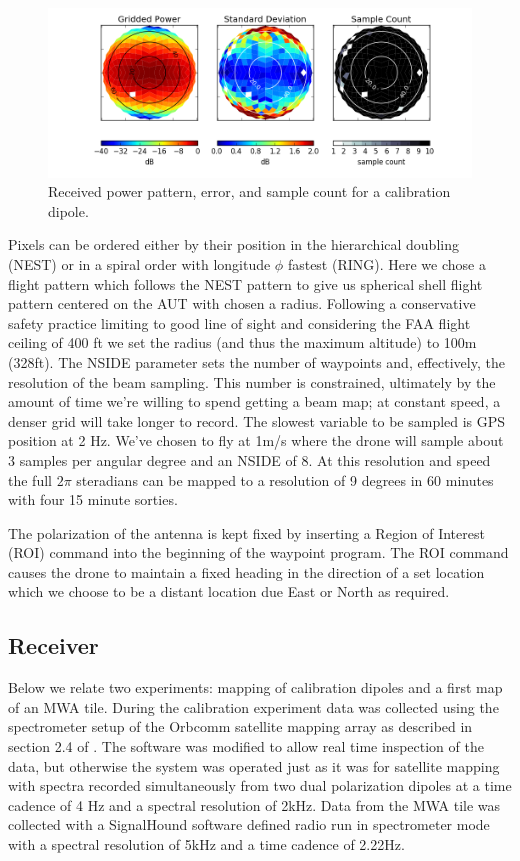 \documentclass[preprint2,numberedappendix,tighten,twocolappendix]{aastex6}
\begin{document}
\begin{figure}[ht]
\begin{center}
\includegraphics[width=\textwidth]{figures/GB_power_rms_count.png}
\caption{Received power pattern, error, and sample count for a calibration dipole.}
\label{fig:beam_std_count}
\end{center}
\end{figure}
Pixels can be ordered either by their position in the hierarchical doubling (NEST) or in a spiral order with  longitude $\phi$ fastest (RING).  Here we chose a flight pattern which follows the NEST pattern to give us spherical shell flight pattern centered on the AUT with chosen a radius. Following a conservative safety practice limiting to good line of sight and considering the FAA flight ceiling of 400 ft we set the radius (and thus the maximum altitude) to 100m (328ft). The NSIDE parameter sets the number of waypoints and, effectively, the resolution of the beam sampling.  This number is constrained, ultimately by the amount of time we're willing to spend getting a beam map; at constant speed, a denser grid will take longer to record.  The slowest variable to be sampled is GPS position at 2 Hz. We've chosen to fly at 1m/s where the drone will sample about 3 samples per angular degree and an NSIDE of 8.  At this resolution and speed the full $2\pi$ steradians can be mapped to a resolution of 9 degrees in 60 minutes with four 15 minute sorties.

The polarization of the antenna is kept fixed by inserting a Region of Interest (ROI) command into the beginning of the waypoint program.  The ROI command causes the drone to maintain a fixed heading in the direction of a set location which we choose to be a distant location due East or North as required.


\subsection{Receiver}
Below we relate two experiments: mapping of calibration dipoles and a first map of an MWA tile. During the calibration experiment data was collected using the spectrometer setup of the Orbcomm satellite mapping array as described in section 2.4 of \citet{2016:NebenHERAdish}. The software was modified to allow real time inspection of the data, but otherwise the system was operated just as it was for satellite mapping with spectra recorded simultaneously from two dual polarization dipoles at a time cadence of 4 Hz and a spectral resolution of 2kHz. Data from the MWA tile was collected with a SignalHound software defined radio run in spectrometer mode with a spectral resolution of 5kHz and a time cadence of 2.22Hz. 
\end{document}
